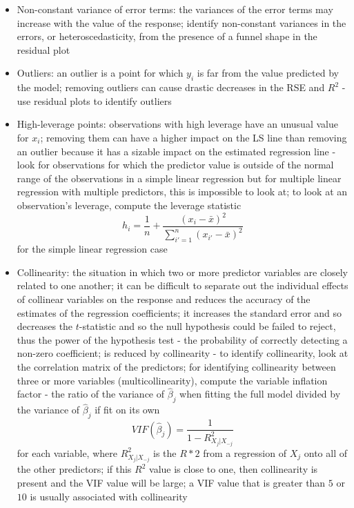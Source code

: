 \documentclass[12pt]{article}
\begin{document}
\begin{itemize}
\begin{itemize}
\item Non-constant variance of error terms: the variances of the error terms may increase with the value of the response; identify non-constant variances in the errors, or heteroscedasticity, from the presence of a funnel shape in the residual plot  
\item Outliers: an outlier is a point for which $y_i$ is far from the value predicted by the model; removing outliers can cause drastic decreases in the RSE and $R^2$ - use residual plots to identify outliers 
\item High-leverage points: observations with high leverage have an unusual value for $x_i$; removing them can have a higher impact on the LS line than removing an outlier because it has a sizable impact on the estimated regression line - look for observations for which the predictor value is outside of the normal range of the observations in a simple linear regression but for multiple linear regression with multiple predictors, this is impossible to look at; to look at an observation's leverage, compute the leverage statistic
$$ h_i = \frac{1}{n} + \frac{(x_i - \bar{x})^2}{\sum_{i' = 1}^n (x_{i'} - \bar{x})^2} $$ for the simple linear regression case
\item Collinearity: the situation in which two or more predictor variables are closely related to one another; it can be difficult to separate out the individual effects of collinear variables on the response and reduces the accuracy of the estimates of the regression coefficients; it increases the standard error and so decreases the $t$-statistic and so the null hypothesis could be failed to reject, thus the power of the hypothesis test - the probability of correctly detecting a non-zero coefficient; is reduced by collinearity - to identify collinearity, look at the correlation matrix of the predictors; for identifying collinearity between three or more variables (multicollinearity), compute the variable inflation factor - the ratio of the variance of $\hat{\beta}_j$ when fitting the full model divided by the variance of $\hat{\beta}_j$ if fit on its own
$$ VIF(\hat{\beta}_j) = \frac{1}{1 - R^2_{X_j | X_{-j}}} $$ for each variable, where $R^2_{X_j| X_{-j}}$ is the $R*2$ from a regression of $X_j$ onto all of the other predictors; if this $R^2$ value is close to one, then collinearity is present and the VIF value will be large; a VIF value that is greater than $5$ or $10$ is usually associated with collinearity 
\end{itemize} 
\end{itemize}
\end{document}
